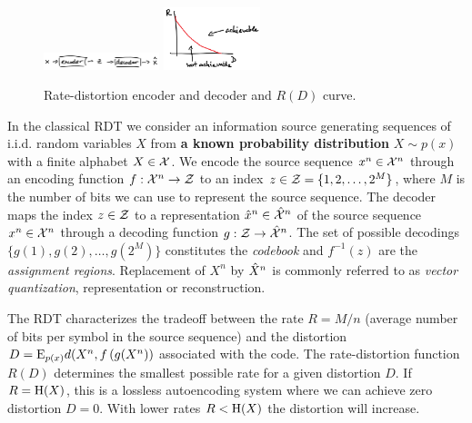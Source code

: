 \begin{figure}
\vspace{-20pt}
\begin{center}
\includegraphics[width=0.3\textwidth]{autoencoder}
\includegraphics[width=0.25\textwidth]{RDcurve}
\end{center}
\vspace{-20pt}
\caption{\small Rate-distortion encoder and decoder and $R(D)$ curve.}
\vspace{-10pt}
\end{figure}
In the classical RDT we consider an information source generating sequences of i.i.d. random variables $X$ from \textbf{a known probability distribution} $X \sim p(x)$ with a finite alphabet $X \in \mathcal{X}$.
We encode the source sequence $x^n \in \mathcal{X}^n$ through an encoding function $f : \mathcal{X}^n \to \mathcal{Z}$ to an index $z \in \mathcal{Z} = \{1, 2, \ldots, 2^M\}$, where $M$ is the number of bits we can use to represent the source sequence.
The decoder maps the index $z \in \mathcal{Z}$ to a representation $\hat{x}^n \in \hat{\mathcal{X}}^n$ of the source sequence $x^n \in \mathcal{X}^n$ through a decoding function $g : \mathcal{Z} \to \hat{\mathcal{X}}^n$. 
The set of possible decodings $\{g(1), g(2), \ldots, g(2^M)\}$ constitutes the \emph{codebook} and $f^{-1}(z)$ are the \emph{assignment regions}.
Replacement of $X^n$ by $\hat{X}^n$ is commonly referred to as \emph{vector quantization}, representation or reconstruction.

The RDT characterizes the tradeoff between the rate $R = M/n$ (average number of bits per symbol in the source sequence) and the distortion $D = \mathrm{E}_{p(x)} d(X^n, f\left( g(X^n)\right)$ associated with the code.
The rate-distortion function $R(D)$ determines the smallest possible rate for a given distortion $D$.
 If $R = \mathrm{H}(X)$, this is a lossless autoencoding system where we can achieve zero distortion $D=0$.
With lower rates $R < \mathrm{H}(X)$ the distortion will increase.

